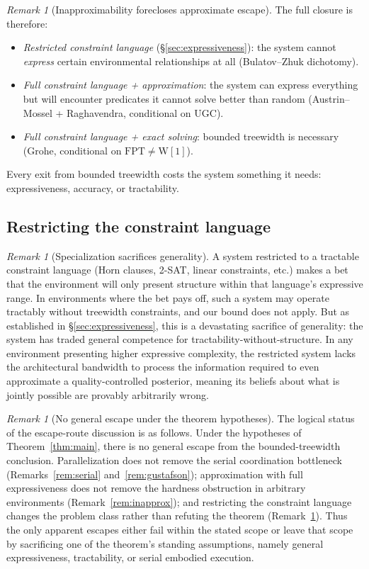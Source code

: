 \documentclass[11pt,a4paper]{article}
\theoremstyle{plain}
\theoremstyle{definition}
\theoremstyle{remark}
\newtheorem{remark}[theorem]{Remark}
\begin{document}
\begin{remark}[Inapproximability forecloses approximate escape]
The full closure is therefore:
\begin{itemize}[nosep]
  \item \emph{Restricted constraint language} (\S\ref{sec:expressiveness}): the system cannot \emph{express} certain environmental relationships at all (Bulatov--Zhuk dichotomy).
  \item \emph{Full constraint language + approximation}: the system can express everything but will encounter predicates it cannot solve better than random (Austrin--Mossel + Raghavendra, conditional on UGC).
  \item \emph{Full constraint language + exact solving}: bounded treewidth is necessary (Grohe, conditional on $\mathrm{FPT} \neq \mathrm{W}[1]$).
\end{itemize}
Every exit from bounded treewidth costs the system something it needs: expressiveness, accuracy, or tractability.
\end{remark}

\subsection{Restricting the constraint language}\label{sec:restricted}

\begin{remark}[Specialization sacrifices generality]\label{rem:specialization}
A system restricted to a tractable constraint language (Horn clauses, 2-SAT, linear constraints, etc.) makes a bet that the environment will only present structure within that language's expressive range.
In environments where the bet pays off, such a system may operate tractably without treewidth constraints, and our bound does not apply.
But as established in \S\ref{sec:expressiveness}, this is a devastating sacrifice of generality: the system has traded general competence for tractability-without-structure.
In any environment presenting higher expressive complexity, the restricted system lacks the architectural bandwidth to process the information required to even approximate a quality-controlled posterior, meaning its beliefs about what is jointly possible are provably arbitrarily wrong.
\end{remark}

\begin{remark}[No general escape under the theorem hypotheses]\label{rem:no-escape}
The logical status of the escape-route discussion is as follows.
Under the hypotheses of Theorem~\ref{thm:main}, there is no general escape from the bounded-treewidth conclusion.
Parallelization does not remove the serial coordination bottleneck (Remarks~\ref{rem:serial} and~\ref{rem:gustafson}); approximation with full expressiveness does not remove the hardness obstruction in arbitrary environments (Remark~\ref{rem:inapprox}); and restricting the constraint language changes the problem class rather than refuting the theorem (Remark~\ref{rem:specialization}).
Thus the only apparent escapes either fail within the stated scope or leave that scope by sacrificing one of the theorem's standing assumptions, namely general expressiveness, tractability, or serial embodied execution.
\end{remark}
\end{document}
